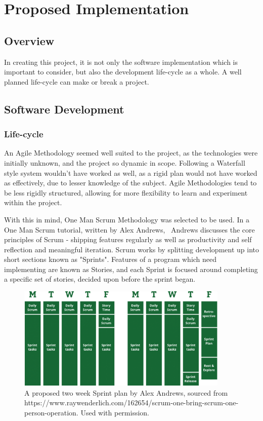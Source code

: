 \documentclass[a4paper,10pt]{report}
\begin{document}
\section{Proposed Implementation}
\subsection{Overview}

In creating this project, it is not only the software implementation which is important to consider, but also the development life-cycle as a whole. A well planned life-cycle can make or break a project. 

\subsection{Software Development}
\subsubsection{Life-cycle}

An Agile Methodology seemed well suited to the project, as the technologies were initially unknown, and the project so dynamic in scope. Following a Waterfall style system wouldn't have worked as well, as a rigid plan would not have worked as effectively, due to lesser knowledge of the subject. Agile Methodologies tend to be less rigidly structured, allowing for more flexibility to learn and experiment within the project. \medskip

With this in mind, One Man Scrum Methodology was selected to be used. In a One Man Scrum tutorial, written by Alex Andrews,~\cite{andrews_2017} Andrews discusses the core principles of Scrum - shipping features regularly as well as productivity and self reflection and meaningful iteration. Scrum works by splitting development up into short sections known as "Sprints". Features of a program which need implementing are known as Stories, and each Sprint is focused around completing a specific set of stories, decided upon before the sprint began. \medskip

\begin{figure}[h!]
    \centering
  \includegraphics[width=0.9\textwidth]{Images/External/RayWenderlich.png}
 \caption [A proposed two week Sprint plan by Alex Andrews]{A proposed two week Sprint plan by Alex Andrews, sourced from https://www.raywenderlich.com/162654/scrum-one-bring-scrum-one-person-operation. Used with permission.}
 \label{fig:two_week_sprint_plan}
\end{figure}
\end{document}
